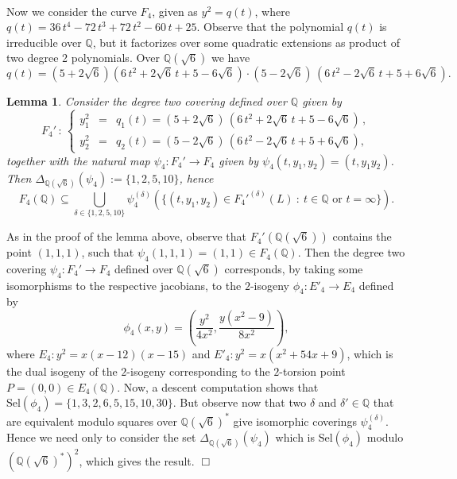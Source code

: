 \documentclass[a4paper,12pt]{amsart}
\newtheorem{lem}[thm]{Lemma}
\theoremstyle{remark}
\theoremstyle{definition}
\newenvironment{pf}{\par\noindent{\bf Proof.}\enspace\ignorespaces}{{\hfill $\Box$}\par\par}
\begin{document}
\

Now we consider the curve $F_4$, given as $y^2=q(t)$, where
$q(t)=36\,t^4 - 72\,t^3 + 72\,t^2 - 60\,t + 25 $. Observe that the
polynomial $q(t)$ is irreducible over ${{\mathbb{Q}}}$, but it factorizes
over some quadratic extensions as product of two degree 2
polynomials. Over ${{\mathbb{Q}}}(\sqrt{6})$ we have
$$
q(t)=(5+2\sqrt{6})(6\,t^2+2\sqrt{6}\,t+5-6\sqrt{6})\cdot (5-2\sqrt{6})\,(6\,t^2-2\sqrt{6}\,t+5+6\sqrt{6}).
$$
\begin{lem}\label{deltaF4}
Consider the degree two covering defined over ${{\mathbb{Q}}}$ given by
$$
F_4'\,:\, \left\{
\begin{array}{rcl}
y_1^2&\!\!\!=&\!\!\!  q_1(t)=(5+2\sqrt{6})\,(6\,t^2+2\sqrt{6}\,t+5-6\sqrt{6})\,  , \\[1mm]
y_2^2 &\!\!\! =&\!\!\!q_2(t)=
(5-2\sqrt{6})\,(6\,t^2-2\sqrt{6}\,t+5+6\sqrt{6}),
\end{array}\right.
$$
together with the natural map $\psi_4:F_4'\to F_4$ given by
$\psi_4(t,y_1,y_2)=(t,y_1y_2)$. Then
$\Delta_{{{\mathbb{Q}}}(\sqrt{6})}(\psi_4):=\{1,2,5,10\}$, hence
$$F_4({{\mathbb{Q}}}) \subseteq \bigcup_{\delta \in \{1,2,5,10\}} \psi_4^{(\delta)}(\{(t,y_1,y_2)\in F_4'^{(\delta)}(L) \ :
\ t\in {{\mathbb{Q}}} \mbox{ or } t=\infty \}).$$
\end{lem}

\begin{pf} As in the proof of the lemma above, observe that
$F_4'({{\mathbb{Q}}}(\sqrt{6}))$ contains the point $(1,1,1)$, such that
$\psi_4(1,1,1)=(1,1)\in F_4({{\mathbb{Q}}})$. Then the degree two covering
$\psi_4:F_4'\to F_4$ defined over ${{\mathbb{Q}}}(\sqrt{6})$ corresponds, by taking some
isomorphisms to the respective jacobians, to the $2$-isogeny
$\phi_4 : E'_4 \to E_4$ defined by
$$
\phi_4(x,y)=\left(\frac{y^2}{4x^2},\frac{y(x^2-9)}{8x^2}\right),
$$
where $E_4: y^2=x(x-12)(x-15)$ and $E'_4: y^2=x(x^2 + 54x + 9)$,
which is the dual isogeny of the $2$-isogeny corresponding to the
$2$-torsion point $P=(0,0)\in E_4({{\mathbb{Q}}})$. Now, a descent
computation shows that $\mbox{Sel}(\phi_4)=\{1, 3, 2, 6, 5, 15,
10, 30\}$. But observe now that two $\delta$ and $\delta'\in {{\mathbb{Q}}}$
that are equivalent modulo squares over ${{\mathbb{Q}}}(\sqrt{6})^*$ give isomorphic
coverings $\psi_4^{(\delta)}$. Hence we need only to consider the
set $\Delta_{{{\mathbb{Q}}}(\sqrt{6})}(\psi_4)$ which is $\mbox{Sel}(\phi_4)$ modulo
$({{\mathbb{Q}}}(\sqrt{6})^*)^2$, which gives the result.
\end{pf}
\end{document}
